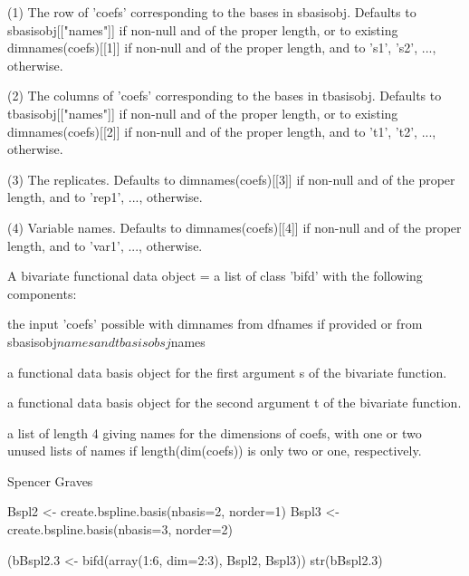 \begin{Arguments}
\begin{ldescription}
(1) The row of 'coefs' corresponding to the bases in sbasisobj.
Defaults to sbasisobj[["names"]] if non-null and of the proper
length, or to existing dimnames(coefs)[[1]] if non-null and of the
proper length, and to 's1', 's2', ...,
otherwise.  

(2) The columns of 'coefs' corresponding to the bases in tbasisobj.
Defaults to tbasisobj[["names"]] if non-null and of the proper
length, or to existing dimnames(coefs)[[2]] if non-null and of the
proper length, and to 't1', 't2', ...,  
otherwise.  

(3) The replicates.  Defaults to dimnames(coefs)[[3]] if non-null
and of the proper length, and to 'rep1', ..., otherwise.

(4) Variable names.  Defaults to dimnames(coefs)[[4]] if non-null
and of the proper length, and to 'var1', ..., otherwise.  

\end{ldescription}
\end{Arguments}
\begin{Value}
A bivariate functional data object = a list of class 'bifd' 
with the following components:

\begin{ldescription}
\item[\code{coefs}] the input 'coefs' possible with dimnames from dfnames if provided or
from sbasisobj$names and tbasisobsj$names

\item[\code{sbasisobj}] a functional data basis object
for the first argument s of the bivariate function.  

\item[\code{tbasisobj}] a functional data basis object
for the second argument t of the bivariate function.  

\item[\code{bifdnames}] a list of length 4 giving names for the dimensions of coefs, with
one or two unused lists of names if length(dim(coefs)) is only two
or one, respectively.  

\end{ldescription}
\end{Value}
\begin{Author}\relax
Spencer Graves
\end{Author}
\begin{SeeAlso}\relax
{}
\end{SeeAlso}
\begin{Examples}
\begin{ExampleCode}
Bspl2 <- create.bspline.basis(nbasis=2, norder=1)
Bspl3 <- create.bspline.basis(nbasis=3, norder=2)

(bBspl2.3 <- bifd(array(1:6, dim=2:3), Bspl2, Bspl3))
str(bBspl2.3)

\end{ExampleCode}
\end{Examples}

